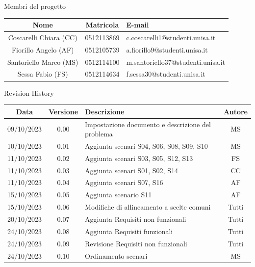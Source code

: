 \documentclass[12pt, a4paper, oneside]{book}
\begin{document}
    \newpage
    \begin{center}
    {\LARGE{Membri del progetto}}
    \end{center}
    \begin{center}
        \begin{tabular}{|c|c|m{8cm}|}
            \hline
            \cellcolor{lightgray} \textbf{Nome} & \cellcolor{lightgray} \textbf{Matricola} & \cellcolor{lightgray} \textbf{E-mail}\\ \hline
            Coscarelli Chiara (CC) & 0512113869 & c.coscarelli1@studenti.unisa.it\\ \hline
            Fiorillo Angelo (AF) & 0512105739 & a.fiorillo9@studenti.unisa.it\\ \hline
            Santoriello Marco (MS) &  0512114100 & m.santoriello37@studenti.unisa.it\\ \hline
            Sessa Fabio (FS) & 0512114634 & f.sessa30@studenti.unisa.it\\ \hline
        \end{tabular}
    \end{center}

    \begin{center}
    {\LARGE{Revision History}}
    \end{center}

    \begin{center}
        \begin{tabular}{|c|c|m{8cm}|c|}
            \hline
            \cellcolor{lightgray} \textbf{Data} & \cellcolor{lightgray} \textbf{Versione} & \cellcolor{lightgray} \textbf{Descrizione} & \cellcolor{lightgray} \textbf{Autore}\\ \hline
            09/10/2023 & 0.00 & Impostazione documento e descrizione del problema & MS\\ \hline
            10/10/2023 & 0.01 & Aggiunta scenari S04, S06, S08, S09, S10 & MS\\ \hline
            11/10/2023 & 0.02 & Aggiunta scenari S03, S05, S12, S13 & FS\\ \hline
            11/10/2023 & 0.03 & Aggiunta scenari S01, S02, S14 & CC\\ \hline
            11/10/2023 & 0.04 & Aggiunta scenari S07, S16 & AF\\ \hline
            15/10/2023 & 0.05 & Aggiunta scenario S11 & AF\\ \hline
            15/10/2023 & 0.06 & Modifiche di allineamento a scelte comuni & Tutti\\ \hline
            20/10/2023 & 0.07 & Aggiunta Requisiti non funzionali & Tutti\\ \hline
            24/10/2023 & 0.08 & Aggiunta Requisiti funzionali & Tutti\\ \hline
            24/10/2023 & 0.09 & Revisione Requisiti non funzionali & Tutti\\ \hline
            24/10/2023 & 0.10 & Ordinamento scenari & MS\\ \hline
        \end{tabular}
    \end{center}
\end{document}

